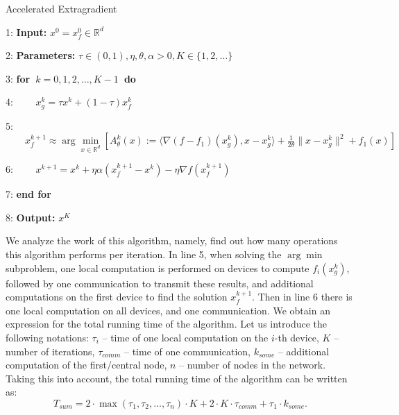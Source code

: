 \documentclass{article}
\theoremstyle{definition}
\theoremstyle{plain}
\begin{document}
\begin{algorithm}
\caption{Accelerated Extragradient}\label{alg:1}
\begin{algorithmic}
\item [1:] \textbf{Input:} $x^0 = x_f^0\in\mathbb R^d$
\item [2:] \textbf{Parameters:} $\tau\in (0, 1), \eta, \theta, \alpha > 0, K\in \{1, 2, \ldots\}$
\item [3:] \textbf{for~}$k = 0, 1, 2, \ldots, K-1$\textbf{~do}
\item [4:]    $\quad\quad x_g^k = \tau x^k + (1 - \tau)x_f^k$
\item [5:]    $\quad\quad x_f^{k+1} \approx \arg\underset{x\in\mathbb R^d}{\min} [A_{\theta}^k (x) := \langle \nabla (f - f_1)(x_g^k), x - x_g^k \rangle + \frac{1}{2\theta}\|x - x_g^k\|^2 + f_1(x)]$ 
\item [6:] $\quad\quad x^{k+1} = x^k + \eta\alpha(x_f^{k+1} - x^k) - \eta\nabla f(x_f^{k+1})$
\item [7:] \textbf{end for}
\item [8:] \textbf{Output:} $x^K$
\end{algorithmic}
\end{algorithm}

We analyze the work of this algorithm, namely, find out how many operations this algorithm performs per iteration. In line 5, when solving the $\arg\min$ subproblem, one local computation is performed on devices to compute $f_i(x_g^k)$, followed by one communication to transmit these results, and additional computations on the first device to find the solution $x_f^{k+1}$. Then in line 6 there is one local computation on all devices, and one communication. We obtain an expression for the total running time of the algorithm. Let us introduce the following notations: $\tau_i$ -- time of one local computation on the $i$-th device, $K$ -- number of iterations, $\tau_{comm}$ -- time of one communication, $k_{some}$ -- additional computation of the first/central node, $n$ -- number of nodes in the network. Taking this into account, the total running time of the algorithm can be written as:
\begin{equation*}
    T_{sum} = 2\cdot\max(\tau_1, \tau_2, \ldots, \tau_n)\cdot K + 2\cdot K\cdot\tau_{comm} + \tau_1\cdot k_{some}.
\end{equation*}
\end{document}
